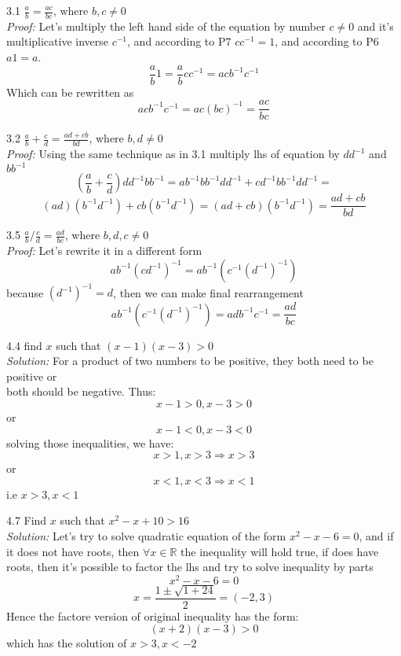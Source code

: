 \documentclass[a4paper, 11pt]{article}
\begin{document}
\hrulefill

3.1 $\frac{a}{b} = \frac{ac}{bc}$, where $b, c \ne 0$\\
\emph{Proof:}
Let's multiply the left hand side of the equation by number $c \ne 0$ and it's\\
multiplicative inverse $c^{-1}$, and according to P7 $cc^{-1} = 1$, and according to P6 $a1 = a$.
$$\frac{a}{b}1 = \frac{a}{b}cc^{-1} = acb^{-1}c^{-1}$$
Which can be rewritten as
$$acb^{-1}c^{-1} = ac(bc)^{-1} = \frac{ac}{bc}$$

\hrulefill

3.2 $\frac{a}{b} + \frac{c}{d} = \frac{ad + cb}{bd}$, where $b, d \ne 0$\\
\emph{Proof:}
Using the same technique as in 3.1 multiply lhs of equation by $dd^{-1}$ and $bb^{-1}$
$$(\frac{a}{b} + \frac{c}{d})dd^{-1}bb^{-1} = ab^{-1}bb^{-1}dd^{-1} + cd^{-1}bb^{-1}dd^{-1} = $$
$$(ad)(b^{-1}d^{-1}) + cb(b^{-1}d^{-1}) = (ad + cb)(b^{-1}d^{-1}) = \frac{ad + cb}{bd}$$

\hrulefill

3.5 $\frac{a}{b} / \frac{c}{d} = \frac{ad}{bc}$, where $b, d, c \ne 0$\\
\emph{Proof:}
Let's rewrite it in a different form
$$ab^{-1}(cd^{-1})^{-1} = ab^{-1}(c^{-1}(d^{-1})^{-1})$$
because $(d^{-1})^{-1} = d$, then we can make final rearrangement
$$ab^{-1}(c^{-1}(d^{-1})^{-1}) = adb^{-1}c^{-1} = \frac{ad}{bc}$$

\hrulefill

4.4 find $x$ such that $(x - 1)(x - 3) > 0$\\
\emph{Solution:}
For a product of two numbers to be positive, they both need to be positive or\\
both should be negative. Thus:
$$x - 1 > 0, x - 3 > 0$$ or $$x - 1 < 0, x - 3 < 0$$ 
solving those inequalities, we have:
$$x > 1, x > 3 \Rightarrow x > 3$$ or $$x < 1, x < 3 \Rightarrow x < 1$$
i.e $x > 3, x < 1$

\hrulefill

4.7 Find $x$ such that $x^2 - x + 10 > 16$\\
\emph{Solution:}
Let's try to solve quadratic equation of the form $x^2 - x - 6 = 0$, and if it
does not have roots, then $\forall x \in \mathbb{R}$ the
inequality will hold true, if does have roots, then it's possible to factor
the lhs and try to solve inequality by parts
$$x^2 - x - 6 = 0$$
$$x = \frac{1 \pm \sqrt{1 + 24}}{2} = (-2, 3)$$
Hence the factore version of original inequality has the form:
$$(x + 2)(x - 3) > 0$$
which has the solution of $x > 3, x < -2$
\end{document}
